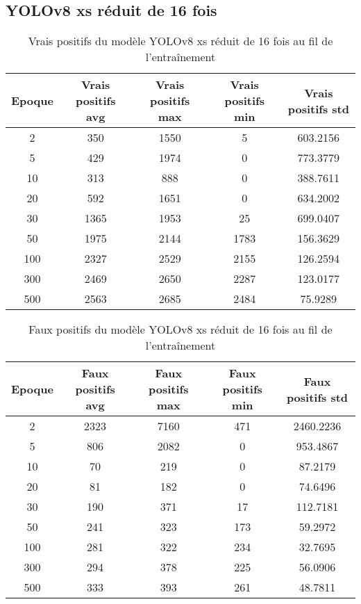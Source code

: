 
\clearpage
\subsection{YOLOv8 xs réduit de 16 fois}

\begin{table}[!ht]
    \caption{Vrais positifs du modèle YOLOv8 xs réduit de 16 fois au fil de l'entraînement}
    \label{tab:yolov8xs_reduced16x_true_positive}
    \centering
    \begin{tabular}{ |c||c|c|c|c|  }
        \hline
        \rowcolor{gray!50}
        Epoque & Vrais positifs avg & Vrais positifs max & Vrais positifs min & Vrais positifs std\\
        \hline
        2 & 350 & 1550 & 5 & 603.2156\\
        5 & 429 & 1974 & 0 & 773.3779\\
        10 & 313 & 888 & 0 & 388.7611\\
        20 & 592 & 1651 & 0 & 634.2002\\
        30 & 1365 & 1953 & 25 & 699.0407\\
        50 & 1975 & 2144 & 1783 & 156.3629\\
        100 & 2327 & 2529 & 2155 & 126.2594\\
        300 & 2469 & 2650 & 2287 & 123.0177\\
        500 & 2563 & 2685 & 2484 & 75.9289\\
        \hline
    \end{tabular}
\end{table}

\begin{table}[!ht]
    \caption{Faux positifs du modèle YOLOv8 xs réduit de 16 fois au fil de l'entraînement}
    \label{tab:yolov8xs_reduced16x_false_positive}
    \centering
    \begin{tabular}{ |c||c|c|c|c|  }
        \hline
        \rowcolor{gray!50}
        Epoque & Faux positifs avg & Faux positifs max & Faux positifs min & Faux positifs std\\
        \hline
        2 & 2323 & 7160 & 471 & 2460.2236\\
        5 & 806 & 2082 & 0 & 953.4867\\
        10 & 70 & 219 & 0 & 87.2179\\
        20 & 81 & 182 & 0 & 74.6496\\
        30 & 190 & 371 & 17 & 112.7181\\
        50 & 241 & 323 & 173 & 59.2972\\
        100 & 281 & 322 & 234 & 32.7695\\
        300 & 294 & 378 & 225 & 56.0906\\
        500 & 333 & 393 & 261 & 48.7811\\
        \hline
    \end{tabular}
\end{table}

